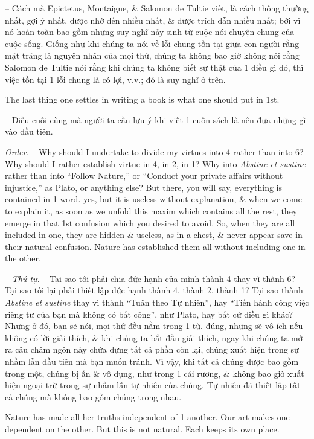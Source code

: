 \documentclass{article}
\begin{document}
\begin{enumerate}
\begin{itemize}
		-- Cách mà {\sc Epictetus, Montaigne, \& Salomon de Tultie} viết, là cách thông thường nhất, gợi ý nhất, được nhớ đến nhiều nhất, \& được trích dẫn nhiều nhất; bởi vì nó hoàn toàn bao gồm những suy nghĩ nảy sinh từ cuộc nói chuyện chung của cuộc sống. Giống như khi chúng ta nói về lỗi chung tồn tại giữa con người rằng mặt trăng là nguyên nhân của mọi thứ, chúng ta không bao giờ không nói rằng {\sc Salomon de Tultie} nói rằng khi chúng ta không biết sự thật của 1 điều gì đó, thì việc tồn tại 1 lỗi chung là có lợi, v.v.; đó là suy nghĩ ở trên.
		
		 The last thing one settles in writing a book is what one should put in 1st.
		
		-- Điều cuối cùng mà người ta cần lưu ý khi viết 1 cuốn sách là nên đưa những gì vào đầu tiên.
		
		 {\it Order.} -- Why should I undertake to divide my virtues into 4 rather than into 6? Why should I rather establish virtue in 4, in 2, in 1? Why into {\it Abstine et sustine} rather than into ``Follow Nature,'' or ``Conduct your private affairs without injustice,'' as {\sc Plato}, or anything else? But there, you will say, everything is contained in 1 word. yes, but it is useless without explanation, \& when we come to explain it, as soon as we unfold this maxim which contains all the rest, they emerge in that 1st confusion which you desired to avoid. So, when they are all included in one, they are hidden \& useless, as in a chest, \& never appear save in their natural confusion. Nature has established them all without including one in the other.
		
		-- {\it Thứ tự.} -- Tại sao tôi phải chia đức hạnh của mình thành 4 thay vì thành 6? Tại sao tôi lại phải thiết lập đức hạnh thành 4, thành 2, thành 1? Tại sao thành {\it Abstine et sustine} thay vì thành ``Tuân theo Tự nhiên'', hay ``Tiến hành công việc riêng tư của bạn mà không có bất công'', như {\sc Plato}, hay bất cứ điều gì khác? Nhưng ở đó, bạn sẽ nói, mọi thứ đều nằm trong 1 từ. đúng, nhưng sẽ vô ích nếu không có lời giải thích, \& khi chúng ta bắt đầu giải thích, ngay khi chúng ta mở ra câu châm ngôn này chứa đựng tất cả phần còn lại, chúng xuất hiện trong sự nhầm lẫn đầu tiên mà bạn muốn tránh. Vì vậy, khi tất cả chúng được bao gồm trong một, chúng bị ẩn \& vô dụng, như trong 1 cái rương, \& không bao giờ xuất hiện ngoại trừ trong sự nhầm lẫn tự nhiên của chúng. Tự nhiên đã thiết lập tất cả chúng mà không bao gồm chúng trong nhau.
		
		 Nature has made all her truths independent of 1 another. Our art makes one dependent on the other. But this is not natural. Each keeps its own place.
		

\end{itemize}
\end{enumerate}
\end{document}
